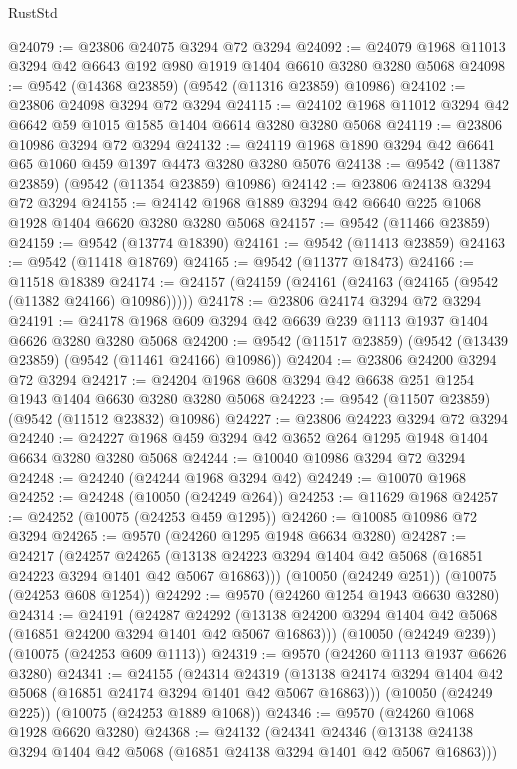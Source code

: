 \begin{lexlean}{RustStd}
\begin{coremodule}
@24079 := @23806 @24075 @3294 @72 @3294
@24092 := @24079 @1968 @11013 @3294 @42 @6643 @192 @980 @1919 @1404 @6610 @3280 @3280 @5068
@24098 := @9542 (@14368 @23859) (@9542 (@11316 @23859) @10986)
@24102 := @23806 @24098 @3294 @72 @3294
@24115 := @24102 @1968 @11012 @3294 @42 @6642 @59 @1015 @1585 @1404 @6614 @3280 @3280 @5068
@24119 := @23806 @10986 @3294 @72 @3294
@24132 := @24119 @1968 @1890 @3294 @42 @6641 @65 @1060 @459 @1397 @4473 @3280 @3280 @5076
@24138 := @9542 (@11387 @23859) (@9542 (@11354 @23859) @10986)
@24142 := @23806 @24138 @3294 @72 @3294
@24155 := @24142 @1968 @1889 @3294 @42 @6640 @225 @1068 @1928 @1404 @6620 @3280 @3280 @5068
@24157 := @9542 (@11466 @23859)
@24159 := @9542 (@13774 @18390)
@24161 := @9542 (@11413 @23859)
@24163 := @9542 (@11418 @18769)
@24165 := @9542 (@11377 @18473)
@24166 := @11518 @18389
@24174 := @24157 (@24159 (@24161 (@24163 (@24165 (@9542 (@11382 @24166) @10986)))))
@24178 := @23806 @24174 @3294 @72 @3294
@24191 := @24178 @1968 @609 @3294 @42 @6639 @239 @1113 @1937 @1404 @6626 @3280 @3280 @5068
@24200 := @9542 (@11517 @23859) (@9542 (@13439 @23859) (@9542 (@11461 @24166) @10986))
@24204 := @23806 @24200 @3294 @72 @3294
@24217 := @24204 @1968 @608 @3294 @42 @6638 @251 @1254 @1943 @1404 @6630 @3280 @3280 @5068
@24223 := @9542 (@11507 @23859) (@9542 (@11512 @23832) @10986)
@24227 := @23806 @24223 @3294 @72 @3294
@24240 := @24227 @1968 @459 @3294 @42 @3652 @264 @1295 @1948 @1404 @6634 @3280 @3280 @5068
@24244 := @10040 @10986 @3294 @72 @3294
@24248 := @24240 (@24244 @1968 @3294 @42)
@24249 := @10070 @1968
@24252 := @24248 (@10050 (@24249 @264))
@24253 := @11629 @1968
@24257 := @24252 (@10075 (@24253 @459 @1295))
@24260 := @10085 @10986 @72 @3294
@24265 := @9570 (@24260 @1295 @1948 @6634 @3280)
@24287 := @24217
    (@24257
      @24265
      (@13138 @24223 @3294 @1404 @42 @5068 (@16851 @24223 @3294 @1401 @42 @5067 @16863)))
    (@10050 (@24249 @251))
    (@10075 (@24253 @608 @1254))
@24292 := @9570 (@24260 @1254 @1943 @6630 @3280)
@24314 := @24191
    (@24287
      @24292
      (@13138 @24200 @3294 @1404 @42 @5068 (@16851 @24200 @3294 @1401 @42 @5067 @16863)))
    (@10050 (@24249 @239))
    (@10075 (@24253 @609 @1113))
@24319 := @9570 (@24260 @1113 @1937 @6626 @3280)
@24341 := @24155
    (@24314
      @24319
      (@13138 @24174 @3294 @1404 @42 @5068 (@16851 @24174 @3294 @1401 @42 @5067 @16863)))
    (@10050 (@24249 @225))
    (@10075 (@24253 @1889 @1068))
@24346 := @9570 (@24260 @1068 @1928 @6620 @3280)
@24368 := @24132
    (@24341
      @24346
      (@13138 @24138 @3294 @1404 @42 @5068 (@16851 @24138 @3294 @1401 @42 @5067 @16863)))

\end{coremodule}
\end{lexlean}
